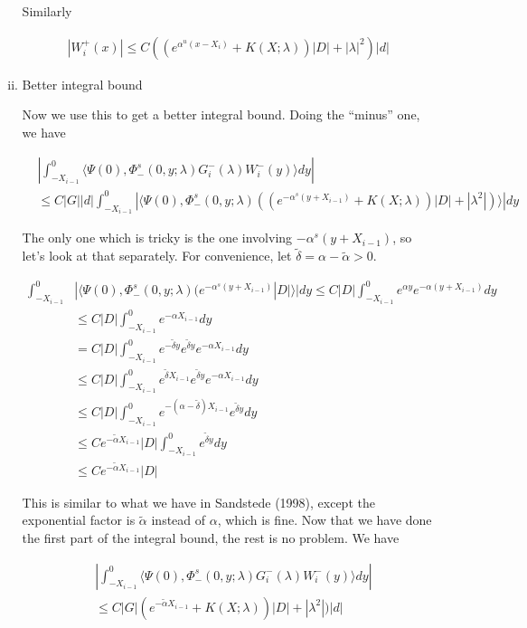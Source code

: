 \documentclass[12pt]{article}
\begin{document}
\begin{enumerate}
\begin{enumerate}[(i)]
Similarly

\begin{align*}
| W_i^+(x)| \leq C ( (e^{\alpha^u(x - X_i)} + K(X; \lambda))|D| + |\lambda|^2 )|d|
\end{align*}

\item Better integral bound

Now we use this to get a better integral bound. Doing the ``minus'' one, we have

\begin{align*}
&\left| \int_{-X_{i-1}}^0 \langle \Psi(0), \Phi^s_-(0, y; \lambda) G_i^-(\lambda)W_i^-(y) \rangle dy \right| \\
&\leq C |G| |d| \int_{-X_{i-1}}^0 | \langle \Psi(0), \Phi^s_-(0, y; \lambda) ( (e^{-\alpha^s(y + X_{i-1})} + K(X; \lambda))|D| + |\lambda^2|) \rangle | dy
\end{align*}

The only one which is tricky is the one involving ${-\alpha^s(y + X_{i-1})}$, so let's look at that separately. For convenience, let $\tilde{\delta} = \alpha - \tilde{\alpha} > 0$.

\begin{align*}
\int_{-X_{i-1}}^0 &| \langle \Psi(0), \Phi^s_-(0, y; \lambda) (e^{-\alpha^s(y + X_{i-1})} |D| \rangle | dy \leq C |D| \int_{-X_{i-1}}^0 e^{\alpha y} e^{-\alpha(y + X_{i-1})} dy \\
&\leq C |D| \int_{-X_{i-1}}^0 e^{-\alpha X_{i-1}} dy \\
&= C |D| \int_{-X_{i-1}}^0 e^{-\tilde{\delta} y} e^{\tilde{\delta} y}  e^{-\alpha X_{i-1}} dy \\
&\leq C |D| \int_{-X_{i-1}}^0 e^{\tilde{\delta} X_{i-1}} e^{\tilde{\delta} y}  e^{-\alpha X_{i-1}} dy \\
&\leq C |D| \int_{-X_{i-1}}^0 e^{-(\alpha - \tilde{\delta}) X_{i-1}} e^{\tilde{\delta} y} dy \\
&\leq C e^{-\tilde{\alpha} X_{i-1}} |D| \int_{-X_{i-1}}^0 e^{\tilde{\delta} y} dy \\
&\leq C e^{-\tilde{\alpha} X_{i-1}} |D|
\end{align*}

This is similar to what we have in Sandstede (1998), except the exponential factor is $\tilde{\alpha}$ instead of $\alpha$, which is fine. Now that we have done the first part of the integral bound, the rest is no problem. We have 

\begin{align*}
&\left| \int_{-X_{i-1}}^0 \langle \Psi(0), \Phi^s_-(0, y; \lambda) G_i^-(\lambda)W_i^-(y) \rangle dy \right| \\
&\leq C |G| ( e^{-\tilde{\alpha} X_{i-1}} + K(X; \lambda))|D| + |\lambda^2|)|d|
\end{align*}


\end{enumerate}
\end{enumerate}
\end{document}
